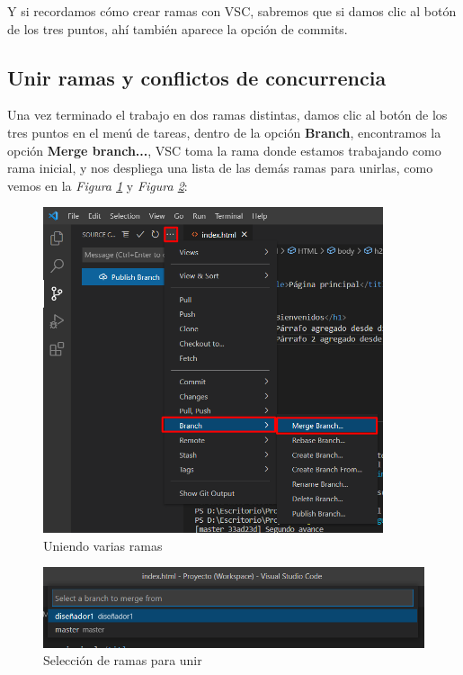 Y si recordamos cómo crear ramas con VSC, sabremos que si damos clic al botón de los tres puntos, ahí también aparece la opción de commits.


\subsection{Unir ramas y conflictos de concurrencia}

Una vez terminado el trabajo en dos ramas distintas, damos clic al botón de los tres puntos en el menú de tareas, dentro de la opción \textbf{Branch}, encontramos la opción \textbf{Merge branch...}, VSC toma la rama donde estamos trabajando como rama inicial, y nos despliega una lista de las demás ramas para unirlas, como vemos en la \textit{Figura \ref{fig: 23}} y \textit{Figura \ref{fig: 24}}:
\begin{figure}[H]
    \centering
    \caption{Uniendo varias ramas}
    \label{fig: 23}
    \includegraphics[width=10cm]{capturas/merge1.png}
\end{figure}
\begin{figure}[H]
    \centering
    \caption{Selección de ramas para unir}
    \label{fig: 24}
    \includegraphics[width=\textwidth]{capturas/merge2.png}
\end{figure}

